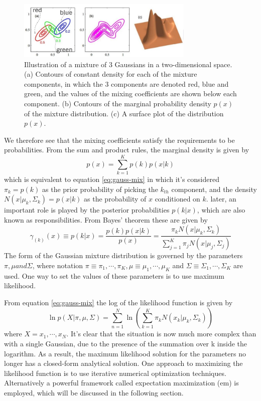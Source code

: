 \documentclass[12pt, a4paper, twoside]{report}
\begin{document}
\begin{figure}[!h]
	\centering
	\includegraphics[width=0.75\textwidth]
	{images/chapter4/gmm-illust-mix}
	\caption{Illustration of a mixture of 3 Gaussians in a two-dimensional space. (a) Contours of constant density for each of the mixture components, in which the 3 components are denoted red, blue and green, and the values of the mixing coefficients are shown below each component. (b) Contours of the marginal probability density $p(x)$ of the mixture distribution. (c) A surface plot of the distribution $p(x)$.}
	\label{fig:gmm-one-mixture}
\end{figure}

We therefore see that the mixing coefficients satisfy the requirements to be probabilities. From the sum and product rules, the marginal density is given by
\begin{equation*}
p(x) = \sum_{k=1}^{K} p(k)p(x|k)
\end{equation*}
which is equivalent to equation \ref{eq:gauss-mix} in which it's considered $\pi_k = p(k)$ as the prior probability of picking the $k_{th}$ component, and the density $N(x|\mu_k,\Sigma_k) = p(x|k)$ as the probability of $x$ conditioned on $k$. later, an important role is played by the posterior probabilities $p(k |x)$, which are also known as responsibilities. From Bayes' theorem these are given by
\begin{equation}
\gamma_{(k)}(x) \equiv p(k|x) = \frac{p(k)p(x|k)}{p(x)} = \frac{\pi_k N(x|\mu_k,\Sigma_k)}{\sum_{j=1}^{K} \pi_j N(x|\mu_j,\Sigma_j)}
\label{eq:gmm-bayes}
\end{equation}
The form of the Gaussian mixture distribution is governed by the parameters $\pi, \mu and \Sigma$, where notation $\pi \equiv {\pi_1, \cdots, \pi_K}, \mu \equiv {\mu_1, \cdots, \mu_K}$ and $\Sigma \equiv {\Sigma_1, \cdots, \Sigma_K}$ are used. One way to set the values of these parameters is to use maximum likelihood.

From equation \ref{eq:gauss-mix} the log of the likelihood function is given by
\begin{equation}
\ln p(X|\pi, \mu, \Sigma) = \sum_{n=1}^{N} \ln \left ( \sum_{k=1}^{K} \pi_k N(x_k|\mu_k,\Sigma_k) \right )
\label{eq:gmm-log-prob}
\end{equation}
where $X = {x_1, \cdots, x_N}$. It's clear that the situation is now much more complex than with a single Gaussian, due to the presence of the summation over k inside the logarithm. As a result, the maximum likelihood solution for the parameters no longer has a closed-form analytical solution. One approach to maximizing the likelihood function is to use iterative numerical optimization techniques. Alternatively a powerful framework called expectation maximization (\acrshort{em}) is employed, which will be discussed in the following section.
\end{document}
